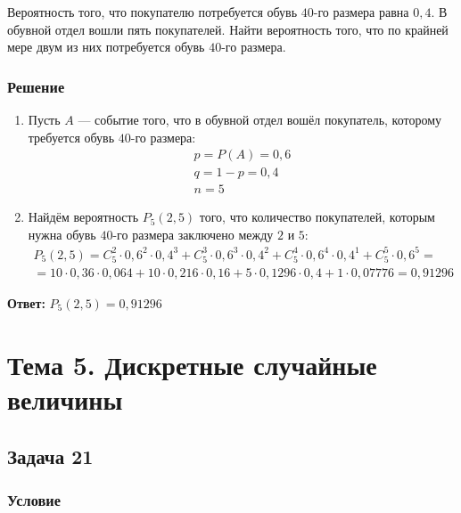 \documentclass[14pt]{article}
\begin{document}
    Вероятность того, что покупателю потребуется обувь $40\text{-го}$ размера равна $0,4$.
    В обувной отдел вошли пять покупателей.
    Найти вероятность того, что по крайней мере двум из них потребуется обувь $40\text{-го}$ размера.

    \subsubsection*{Решение}

    \begin{enumerate}[wide, labelwidth=!, labelindent=0pt]
        \item Пусть $A$ --- событие того, что в обувной отдел вошёл покупатель, которому требуется обувь $40\text{-го}$ размера:
        \begin{gather*}
            p = P(A) = 0,6 \\
            q = 1 - p = 0,4 \\
            n = 5
        \end{gather*}
        \item Найдём вероятность $P_5(2, 5)$ того, что количество покупателей, которым нужна обувь $40\text{-го}$ размера заключено между $2$ и $5$:
        \begin{gather*}
            P_5(2, 5) = C_5^2 \cdot 0,6^2 \cdot 0,4^3 + C_5^3 \cdot 0,6^3 \cdot 0,4^2 + C_5^4 \cdot 0,6^4 \cdot 0,4^1 + C_5^5 \cdot 0,6^5 = \\
            = 10 \cdot 0,36 \cdot 0,064 + 10 \cdot 0,216 \cdot 0,16 + 5 \cdot 0,1296 \cdot 0,4 + 1 \cdot 0,07776 = 0,91296
        \end{gather*}
    \end{enumerate}
    \hspace{290pt}\textbf{Ответ:} $P_5(2, 5) = 0,91296$

    \newpage

    \section*{Тема 5. Дискретные случайные величины}

    \subsection*{Задача 21}
    \subsubsection*{Условие}
\end{document}
